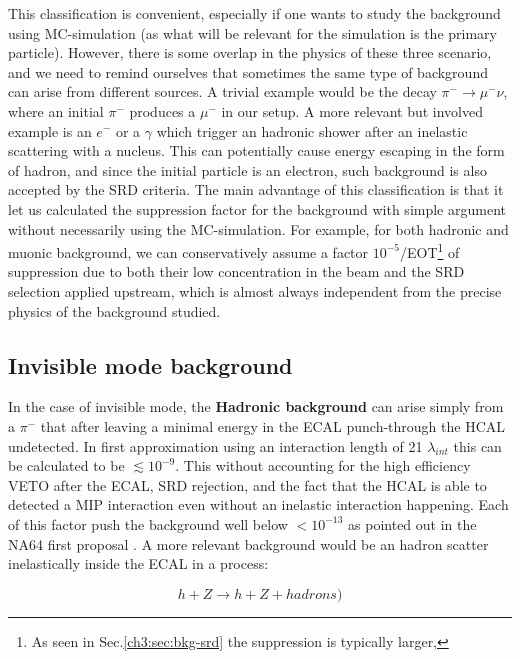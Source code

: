 This classification is convenient, especially if one wants to study the background using MC-simulation (as what will be relevant for the simulation is the primary particle). However, there is some overlap in the physics of these three scenario, and we need to remind ourselves that sometimes the same type of background can arise from different sources. A trivial example would be the decay $\pi^- \rightarrow \mu^-\nu$, where an initial $\pi^-$ produces a $\mu^-$ in our setup. A more relevant but involved example is an $e^-$ or a $\gamma$ which trigger an hadronic shower after an inelastic scattering with a nucleus. This can potentially cause energy escaping in the form of hadron, and since the initial particle is an electron, such background is also accepted by the SRD criteria. The main advantage of this classification is that it let us calculated the suppression factor for the background with simple argument without necessarily using the MC-simulation. For example, for both hadronic and muonic background, we can conservatively assume a factor $10^{-5}$/EOT\footnote{As seen in Sec.\ref{ch3:sec:bkg-srd} the suppression is typically larger,} of suppression due to both their low concentration in the beam and the SRD selection applied upstream, which is almost always independent from the precise physics of the background studied.

\subsection{Invisible mode background}

In the case of invisible mode, the \textbf{Hadronic background} can arise simply from a $\pi^-$ that after leaving a minimal energy in the ECAL punch-through the HCAL undetected. In first approximation using an interaction length of 21 $\lambda_{int}$ this can be calculated to be $\lesssim 10^{-9}$. This without accounting for the high efficiency VETO after the ECAL, SRD rejection, and the fact that the HCAL is able to detected a MIP interaction even without an inelastic interaction happening. Each of this factor push the background well below $<10^{-13}$ as pointed out in the NA64 first proposal \cite{Andreas:2013lya}. A more relevant background would be an hadron scatter inelastically inside the ECAL in a process:

\begin{equation}
  \label{eq:pion-nucleus-scattering}
  h + Z \longrightarrow h + Z + hadrons)
\end{equation}

